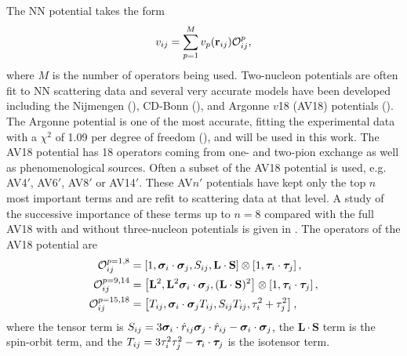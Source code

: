 The NN potential takes the form
\begin{equation}
   v_{ij} = \sum\limits_{p=1}^M v_p(\mathbf{r}_{ij})\mathcal{O}^p_{ij},
\end{equation}
where $M$ is the number of operators being used.
Two-nucleon potentials are often fit to NN scattering data and several very accurate models have been developed including the Nijmengen (\cite{nagels1975,stoks1994}), CD-Bonn (\cite{machleidt1996,machleidt2001}), and Argonne $v$18 (AV18) potentials (\cite{wiringa1984,wiringa1995}). The Argonne potential is one of the most accurate, fitting the experimental data with a $\chi^2$ of 1.09 per degree of freedom (\cite{wiringa1995}), and will be used in this work. The AV18 potential has 18 operators coming from one- and two-pion exchange as well as phenomenological sources. Often a subset of the AV18 potential is used, e.g. AV4$'$, AV6$'$, AV8$'$ or AV14$'$. These AV$n'$ potentials have kept only the top $n$ most important terms and are refit to scattering data at that level. A study of the successive importance of these terms up to $n=8$ compared with the full AV18 with and without three-nucleon potentials is given in \cite{wiringa2002}. The operators of the AV18 potential are
\begin{align}
   \mathcal{O}_{ij}^{p=1,8} &= \left[1,\bm{\sigma}_i\cdot\bm{\sigma}_j,S_{ij},\mathbf{L}\cdot\mathbf{S}\right]\otimes\left[1,\bm{\tau}_i\cdot\bm{\tau}_j\right], \\
   \mathcal{O}_{ij}^{p=9,14} &= \left[\mathbf{L}^2,\mathbf{L}^2\bm{\sigma}_i\cdot\bm{\sigma}_j,(\mathbf{L}\cdot\mathbf{S})^2\right]\otimes\left[1,\bm{\tau}_i\cdot\bm{\tau}_j\right], \\
   \mathcal{O}_{ij}^{p=15,18} &= \left[T_{ij},\bm{\sigma}_i\cdot\bm{\sigma}_j T_{ij},S_{ij}T_{ij},\tau_i^2+\tau_j^2\right],
\end{align}
where the tensor term is $S_{ij} = 3\bm{\sigma}_i\cdot\hat{r}_{ij}\bm{\sigma}_j\cdot\hat{r}_{ij}-\bm{\sigma}_i\cdot\bm{\sigma}_j$, the $\mathbf{L}\cdot\mathbf{S}$ term is the spin-orbit term, and the $T_{ij} = 3\tau_i^2\tau_j^2-\bm{\tau}_i\cdot\bm{\tau}_j$ is the isotensor term.

